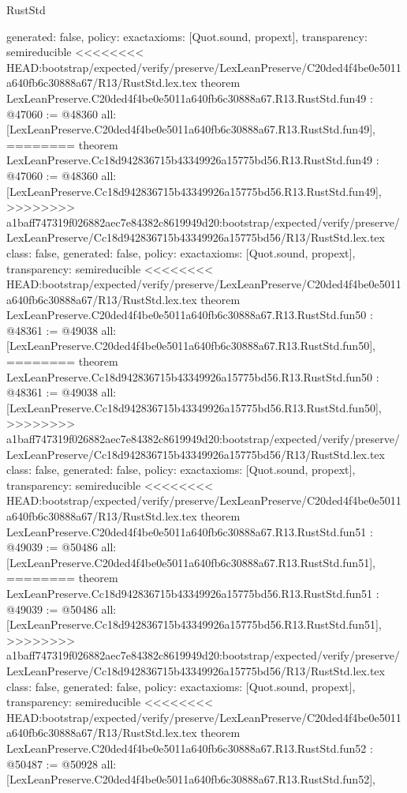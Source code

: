 \begin{lexlean}{RustStd}
\begin{coremodule}
{\begin{coremodule}
{{{{{{{{{{{{{{{{{{{{{{{{{{{{{{{{{{{{{{{{{{{{{{{{{{{{  generated: false,
  policy: exact{axioms: [Quot.sound, propext]},
  transparency: semireducible
}
<<<<<<<< HEAD:bootstrap/expected/verify/preserve/LexLeanPreserve/C20ded4f4be0e5011a640fb6c30888a67/R13/RustStd.lex.tex
theorem LexLeanPreserve.C20ded4f4be0e5011a640fb6c30888a67.R13.RustStd.fun49 : @47060 := @48360 {
  all: [LexLeanPreserve.C20ded4f4be0e5011a640fb6c30888a67.R13.RustStd.fun49],
========
theorem LexLeanPreserve.Cc18d942836715b43349926a15775bd56.R13.RustStd.fun49 : @47060 := @48360 {
  all: [LexLeanPreserve.Cc18d942836715b43349926a15775bd56.R13.RustStd.fun49],
>>>>>>>> a1baff747319f026882aec7e84382c8619949d20:bootstrap/expected/verify/preserve/LexLeanPreserve/Cc18d942836715b43349926a15775bd56/R13/RustStd.lex.tex
  class: false,
  generated: false,
  policy: exact{axioms: [Quot.sound, propext]},
  transparency: semireducible
}
<<<<<<<< HEAD:bootstrap/expected/verify/preserve/LexLeanPreserve/C20ded4f4be0e5011a640fb6c30888a67/R13/RustStd.lex.tex
theorem LexLeanPreserve.C20ded4f4be0e5011a640fb6c30888a67.R13.RustStd.fun50 : @48361 := @49038 {
  all: [LexLeanPreserve.C20ded4f4be0e5011a640fb6c30888a67.R13.RustStd.fun50],
========
theorem LexLeanPreserve.Cc18d942836715b43349926a15775bd56.R13.RustStd.fun50 : @48361 := @49038 {
  all: [LexLeanPreserve.Cc18d942836715b43349926a15775bd56.R13.RustStd.fun50],
>>>>>>>> a1baff747319f026882aec7e84382c8619949d20:bootstrap/expected/verify/preserve/LexLeanPreserve/Cc18d942836715b43349926a15775bd56/R13/RustStd.lex.tex
  class: false,
  generated: false,
  policy: exact{axioms: [Quot.sound, propext]},
  transparency: semireducible
}
<<<<<<<< HEAD:bootstrap/expected/verify/preserve/LexLeanPreserve/C20ded4f4be0e5011a640fb6c30888a67/R13/RustStd.lex.tex
theorem LexLeanPreserve.C20ded4f4be0e5011a640fb6c30888a67.R13.RustStd.fun51 : @49039 := @50486 {
  all: [LexLeanPreserve.C20ded4f4be0e5011a640fb6c30888a67.R13.RustStd.fun51],
========
theorem LexLeanPreserve.Cc18d942836715b43349926a15775bd56.R13.RustStd.fun51 : @49039 := @50486 {
  all: [LexLeanPreserve.Cc18d942836715b43349926a15775bd56.R13.RustStd.fun51],
>>>>>>>> a1baff747319f026882aec7e84382c8619949d20:bootstrap/expected/verify/preserve/LexLeanPreserve/Cc18d942836715b43349926a15775bd56/R13/RustStd.lex.tex
  class: false,
  generated: false,
  policy: exact{axioms: [Quot.sound, propext]},
  transparency: semireducible
}
<<<<<<<< HEAD:bootstrap/expected/verify/preserve/LexLeanPreserve/C20ded4f4be0e5011a640fb6c30888a67/R13/RustStd.lex.tex
theorem LexLeanPreserve.C20ded4f4be0e5011a640fb6c30888a67.R13.RustStd.fun52 : @50487 := @50928 {
  all: [LexLeanPreserve.C20ded4f4be0e5011a640fb6c30888a67.R13.RustStd.fun52],
}}}}}}}}}}}}}}}}}}}}}}}}}}}}}}}}}}}}}}}}}}}}}}}}}}}}}}}
\end{coremodule}}
\end{coremodule}
\end{lexlean}
